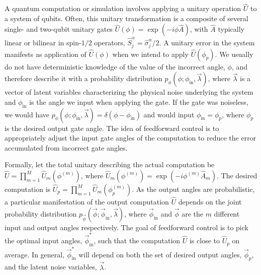 \documentclass[prx,aps,twocolumn,showpacs,superscriptaddress,10pt]{revtex4-1}
\begin{document}
A quantum computation or simulation involves applying a unitary operation $\hat{U}$ to a system of qubits. Often, this unitary transformation is a composite of several single- and two-qubit unitary gates $\hat{U}\left(\phi\right)=\exp\left(-i\phi\hat{A}\right)$, with $\hat{A}$ typically linear or bilinear in spin-$1/2$ operators, $\hat{S}_{j}^{\alpha}=\hat{\sigma}_{j}^{\alpha}/2$. A unitary error in the system manifests as application of $\hat{U}\left(\phi\right)$ when we intend to apply $\hat{U}\left(\phi_{p}\right)$. We usually do not have deterministic knowledge of the value of the incorrect angle, $\phi$, and therefore describe it with a probability distribution $p_{\phi}\left(\phi;\phi_\textrm{in},\vec{\lambda}\right)$, where $\vec{\lambda}$ is a vector of latent variables characterizing the physical noise underlying the system and $\phi_\textrm{in}$ is the angle we input when applying the gate. If the gate was noiseless, we would have $p_{\phi}\left(\phi;\phi_\textrm{in},\vec{\lambda}\right)=\delta\left(\phi-\phi_\textrm{in}\right)$ and would input $\phi_\textrm{in}=\phi_{p}$, where $\phi_{p}$ is the desired output gate angle. The idea of feedforward control is to appropriately adjust the input gate angles of the computation to reduce the error accumulated from incorrect gate angles.

Formally, let the total unitary describing the actual computation be $\hat{U}=\prod_{m=1}^{M}\hat{U}_{m}\left(\phi^{(m)}\right)$, where  $\hat{U}_{m}\left(\phi^{(m)}\right)=\exp\left(-i\phi^{(m)}\hat{A}_{m}\right)$. The desired computation is $\hat{U}_{p}=\prod_{m=1}^{M}\hat{U}_{m}\left(\phi_{p}^{(m)}\right)$.  As the output angles are probabilistic, a particular manifestation of the output computation $\hat{U}$ depends on the joint probability distribution $p_{\vec{\phi}}\left(\vec{\phi};\vec{\phi}_\textrm{in},\vec{\lambda}\right)$, where $\vec{\phi}_\textrm{in}$ and $\vec{\phi}$ are the $m$ different input and output angles respectively. The goal of feedforward control is to pick the optimal input angles, $\vec{\phi}_\textrm{in}^{*}$, such that the computation $\hat{U}$ is close to $\hat{U}_{p}$ on average. In general, $\vec{\phi}_\textrm{in}^{*}$ will depend on both the set of desired output angles, $\vec{\phi}_{p}$, and the latent noise variables, $\vec{\lambda}$. 
\end{document}

